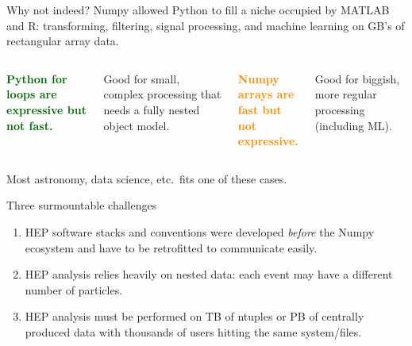 \documentclass[aspectratio=169]{beamer}
\begin{document}
\begin{frame}{Why not indeed?}
\vspace{0.5 cm}
Numpy allowed Python to fill a niche occupied by MATLAB and R: transforming, filtering, signal processing, and machine learning on GB's of rectangular array data.

\vspace{0.75 cm}
\begin{columns}[t]

\textcolor{darkgreen}{\bf Python for loops are expressive but not fast.}

\vspace{0.25 cm}
Good for small, complex processing that needs a fully nested object model.

\textcolor{darkorange}{\bf Numpy arrays are \\ fast but not expressive.}

\vspace{0.25 cm}
Good for biggish, more regular processing (including ML).

\end{columns}

\vspace{0.75 cm}
Most astronomy, data science, etc.\ fits one of these cases.
\end{frame}

\begin{frame}{Three surmountable challenges}
\large
\vspace{0.5 cm}
\begin{center}
\begin{minipage}{0.75\linewidth}
\begin{enumerate}\setlength{\itemsep}{1 cm}
\item HEP software stacks and conventions were developed {\it before} the Numpy ecosystem and have to be retrofitted to communicate easily.

\item HEP analysis relies heavily on nested data: each event may have a different number of particles.

\item HEP analysis must be performed on TB of ntuples or PB of centrally produced data with thousands of users hitting the same system/files.
\end{enumerate}
\end{minipage}\mbox{\hspace{1 cm}}
\end{center}
\end{frame}
\end{document}
